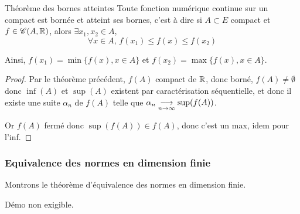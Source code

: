 \begin{theoreme}{Théorème des bornes atteintes}{}
    Toute fonction numérique continue sur un compact est bornée et atteint ses bornes, c'est à dire 
    si $A \subset E$ compact et $f \in \mathscr C(A, \mathbb{R})$, alors 
    $\exists x_1, x_2 \in A$,  $$\forall x \in A, \, f(x_1) \leqslant f(x) \leqslant f(x_2)$$

    Ainsi, $f(x_1) = \min \{ f(x), x \in A \}$ et $f(x_2) = \max \{ f(x), x \in A \}$.
\end{theoreme}


\begin{proof}
    Par le théorème précédent, $f(A)$ compact de $\mathbb{R}$, donc borné, $f(A) \neq \emptyset$ donc 
    $ \inf(A)$ et $\sup(A)$ existent par caractérisation séquentielle, et donc il existe une suite 
    $\alpha_n$ de $f(A)$ telle que $\alpha_n \underset{n \to \infty}{\longrightarrow} \sup(f(A))$.

    Or $f(A)$ fermé donc $\sup(f(A)) \in f(A)$, donc c'est un max, idem pour l'inf. 
\end{proof}

\subsubsection{Equivalence des normes en dimension finie }

Montrons le théorème d'équivalence des normes en dimension finie.

Démo non exigible.


